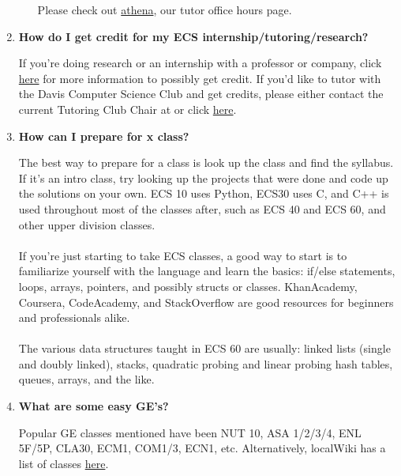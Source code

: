 \documentclass{article}
\begin{document}
\begin{enumerate}
        \begin{itemize}
            Please check out \href{https://daviscsclub.org/tutoring/athena}{athena}, our tutor office hours page.
        \end{itemize}
    \item \textbf{How do I get credit for my ECS internship/tutoring/research?}
    \begin{itemize}
        If you're doing research or an internship with a professor or company, click \href{http://www.cs.ucdavis.edu/undergraduate/192-199/}{here} for more information to possibly get credit. If you'd like to tutor with the Davis Computer Science Club and get credits, please either contact the current Tutoring Club Chair at  or click  \href{https://daviscsclub.org/committee/tutoring}{here}.  
    \end{itemize}
    \item \textbf{How can I prepare for x class?}
    \begin{itemize}
        The best way to prepare for a class is look up the class and find the syllabus. If it's an intro class, try looking up the projects that were done and code up the solutions on your own. ECS 10 uses Python, ECS30 uses C, and C++ is used throughout most of the classes after, such as ECS 40 and ECS 60, and other upper division classes. \\\\
        If you're just starting to take ECS classes, a good way to start is to familiarize yourself with the language and learn the basics: if/else statements, loops, arrays, pointers, and possibly structs or classes. KhanAcademy, Coursera, CodeAcademy, and StackOverflow are good resources for beginners and professionals alike. \\\\
        The various data structures taught in ECS 60 are usually: linked lists (single and doubly linked), stacks, quadratic probing and linear probing hash tables, queues, arrays, and the like.  
    \end{itemize}
    \item \textbf {What are some easy GE's?}
    \begin{itemize}
        Popular GE classes mentioned have been NUT 10, ASA 1/2/3/4, ENL 5F/5P, CLA30, ECM1, COM1/3, ECN1, etc. Alternatively, localWiki has a list of classes 
        \href{https://localwiki.org/davis/Best_Classes_To_Take_Your_Last_Quarter...or_so_I've_heard}{here}.
    \end{itemize}

\end{enumerate}
\end{document}
